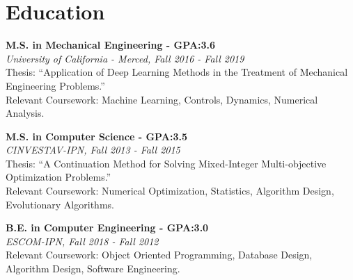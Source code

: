\documentclass[a4paper,10pt]{article}
\begin{document}
\section{Education}

\textbf{M.S. in Mechanical Engineering - GPA:3.6}\\
\emph{University of California - Merced, Fall 2016 - Fall 2019}\\
Thesis: ``Application of Deep Learning Methods in the Treatment of Mechanical Engineering Problems.''\\
Relevant Coursework: Machine Learning, Controls, Dynamics, Numerical Analysis.

\textbf{M.S. in Computer Science - GPA:3.5}\\
\emph{CINVESTAV-IPN, Fall 2013 - Fall 2015}\\
Thesis: ``A Continuation Method for Solving Mixed-Integer Multi-objective Optimization Problems.''\\
Relevant Coursework: Numerical Optimization, Statistics, Algorithm Design, Evolutionary Algorithms.

\textbf{B.E. in Computer Engineering - GPA:3.0}\\
\emph{ESCOM-IPN, Fall 2018 - Fall 2012}\\
Relevant Coursework: Object Oriented Programming, Database Design, Algorithm Design, Software Engineering.

\vspace{0.6em}

\end{document}
